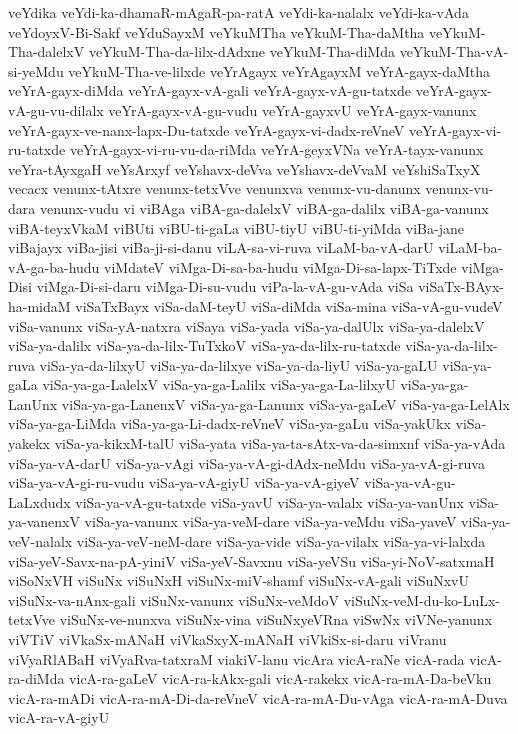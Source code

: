 {veYdika
veYdi-ka-dhamaR-mAgaR-pa-ratA
veYdi-ka-nalalx
veYdi-ka-vAda
veYdoyxV-Bi-Sakf
veYduSayxM
veYkuMTha
veYkuM-Tha-daMtha
veYkuM-Tha-dalelxV
veYkuM-Tha-da-lilx-dAdxne
veYkuM-Tha-diMda
veYkuM-Tha-vA-si-yeMdu
veYkuM-Tha-ve-lilxde
veYrAgayx
veYrAgayxM
veYrA-gayx-daMtha
veYrA-gayx-diMda
veYrA-gayx-vA-gali
veYrA-gayx-vA-gu-tatxde
veYrA-gayx-vA-gu-vu-dilalx
veYrA-gayx-vA-gu-vudu
veYrA-gayxvU
veYrA-gayx-vanunx
veYrA-gayx-ve-nanx-lapx-Du-tatxde
veYrA-gayx-vi-dadx-reVneV
veYrA-gayx-vi-ru-tatxde
veYrA-gayx-vi-ru-vu-da-riMda
veYrA-geyxVNa
veYrA-tayx-vanunx
veYra-tAyxgaH
veYsArxyf
veYshavx-deVva
veYshavx-deVvaM
veYshiSaTxyX
vecacx
venunx-tAtxre
venunx-tetxVve
venunxva
venunx-vu-danunx
venunx-vu-dara
venunx-vudu
vi
viBAga
viBA-ga-dalelxV
viBA-ga-dalilx
viBA-ga-vanunx
viBA-teyxVkaM
viBUti
viBU-ti-gaLa
viBU-tiyU
viBU-ti-yiMda
viBa-jane
viBajayx
viBa-jisi
viBa-ji-si-danu
viLA-sa-vi-ruva
viLaM-ba-vA-darU
viLaM-ba-vA-ga-ba-hudu
viMdateV
viMga-Di-sa-ba-hudu
viMga-Di-sa-lapx-TiTxde
viMga-Disi
viMga-Di-si-daru
viMga-Di-su-vudu
viPa-la-vA-gu-vAda
viSa
viSaTx-BAyx-ha-midaM
viSaTxBayx
viSa-daM-teyU
viSa-diMda
viSa-mina
viSa-vA-gu-vudeV
viSa-vanunx
viSa-yA-natxra
viSaya
viSa-yada
viSa-ya-dalUlx
viSa-ya-dalelxV
viSa-ya-dalilx
viSa-ya-da-lilx-TuTxkoV
viSa-ya-da-lilx-ru-tatxde
viSa-ya-da-lilx-ruva
viSa-ya-da-lilxyU
viSa-ya-da-lilxye
viSa-ya-da-liyU
viSa-ya-gaLU
viSa-ya-gaLa
viSa-ya-ga-LalelxV
viSa-ya-ga-Lalilx
viSa-ya-ga-La-lilxyU
viSa-ya-ga-LanUnx
viSa-ya-ga-LanenxV
viSa-ya-ga-Lanunx
viSa-ya-gaLeV
viSa-ya-ga-LelAlx
viSa-ya-ga-LiMda
viSa-ya-ga-Li-dadx-reVneV
viSa-ya-gaLu
viSa-yakUkx
viSa-yakekx
viSa-ya-kikxM-talU
viSa-yata
viSa-ya-ta-sAtx-va-da-simxnf
viSa-ya-vAda
viSa-ya-vA-darU
viSa-ya-vAgi
viSa-ya-vA-gi-dAdx-neMdu
viSa-ya-vA-gi-ruva
viSa-ya-vA-gi-ru-vudu
viSa-ya-vA-giyU
viSa-ya-vA-giyeV
viSa-ya-vA-gu-LaLxdudx
viSa-ya-vA-gu-tatxde
viSa-yavU
viSa-ya-valalx
viSa-ya-vanUnx
viSa-ya-vanenxV
viSa-ya-vanunx
viSa-ya-veM-dare
viSa-ya-veMdu
viSa-yaveV
viSa-ya-veV-nalalx
viSa-ya-veV-neM-dare
viSa-ya-vide
viSa-ya-vilalx
viSa-ya-vi-lalxda
viSa-yeV-Savx-na-pA-yiniV
viSa-yeV-Savxnu
viSa-yeVSu
viSa-yi-NoV-satxmaH
viSoNxVH
viSuNx
viSuNxH
viSuNx-miV-shamf
viSuNx-vA-gali
viSuNxvU
viSuNx-va-nAnx-gali
viSuNx-vanunx
viSuNx-veMdoV
viSuNx-veM-du-ko-LuLx-tetxVve
viSuNx-ve-nunxva
viSuNx-vina
viSuNxyeVRna
viSwNx
viVNe-yanunx
viVTiV
viVkaSx-mANaH
viVkaSxyX-mANaH
viVkiSx-si-daru
viVranu
viVyaRlABaH
viVyaRva-tatxraM
viakiV-lanu
vicAra
vicA-raNe
vicA-rada
vicA-ra-diMda
vicA-ra-gaLeV
vicA-ra-kAkx-gali
vicA-rakekx
vicA-ra-mA-Da-beVku
vicA-ra-mADi
vicA-ra-mA-Di-da-reVneV
vicA-ra-mA-Du-vAga
vicA-ra-mA-Duva
vicA-ra-vA-giyU
}

